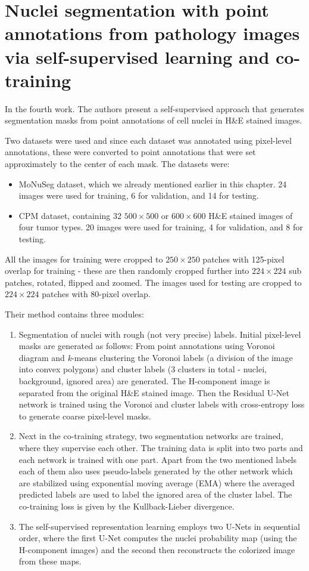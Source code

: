 \section{Nuclei segmentation with point annotations from pathology images via self-supervised learning and co-training \cite{Lin2023}}
In the fourth work. The authors present a self-supervised approach that generates segmentation masks from point annotations of cell nuclei in H\&E stained images.

Two datasets were used and since each dataset was annotated using pixel-level annotations, these were converted to point annotations that were set approximately to the center of each mask. The datasets were:

\begin{itemize}
    \item MoNuSeg dataset, which we already mentioned earlier in this chapter. 24 images were used for training, 6 for validation, and 14 for testing.
    \item CPM dataset, containing 32 $500\!\times\!500$ or $600\!\times\!600$ H\&E stained images of four tumor types. 20 images were used for training, 4 for validation, and 8 for testing.
\end{itemize}

All the images for training were cropped to $250\!\times\!250$ patches with 125-pixel overlap for training - these are then randomly cropped further into $224\!\times\!224$ sub patches, rotated, flipped and zoomed. The images used for testing are cropped to $224\!\times\!224$ patches with 80-pixel overlap.

Their method contains three modules:

\begin{enumerate}
    \item Segmentation of nuclei with rough (not very precise) labels. Initial pixel-level masks are generated as follows: From point annotations using Voronoi diagram and \textit{k}-means clustering the Voronoi labels (a division of the image into convex polygons) and cluster labels (3 clusters in total - nuclei, background, ignored area) are generated. The H-component image is separated from the original H\&E stained image. Then the Residual U-Net network is trained using the Voronoi and cluster labels with cross-entropy loss to generate coarse pixel-level masks.
    \item Next in the co-training strategy, two segmentation networks are trained, where they supervise each other. The training data is split into two parts and each network is trained with one part. Apart from the two mentioned labels each of them also uses pseudo-labels generated by the other network which are stabilized using exponential moving average (EMA) where the averaged predicted labels are used to label the ignored area of the cluster label. The co-training loss is given by the Kullback-Lieber divergence.
    \item The self-supervised representation learning employs two U-Nets in sequential order, where the first U-Net computes the nuclei probability map (using the H-component images) and the second then reconstructs the colorized image from these maps.
\end{enumerate}

